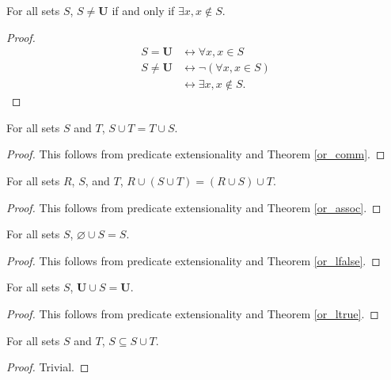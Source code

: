 \documentclass[../../math.tex]{subfiles}
\begin{document}
\begin{theorem} \label{all_neq}
    For all sets $S$, $S \neq \bm U$ if and only if $\exists x, x \notin S$.
\end{theorem}
\begin{proof}
    \begin{align*}
        S = \bm U &\leftrightarrow \forall x, x \in S \\
        S \neq \bm U &\leftrightarrow \neg(\forall x, x \in S) \\
                 &\leftrightarrow \exists x, x \notin S.
    \end{align*}
\end{proof}

\begin{theorem} \label{union_comm}
    For all sets $S$ and $T$, $S \cup T = T \cup S$.
\end{theorem}
\begin{proof}
    This follows from predicate extensionality and Theorem \ref{or_comm}.
\end{proof}

\begin{theorem} \label{union_assoc}
    For all sets $R$, $S$, and $T$, $R \cup (S \cup T) = (R \cup S) \cup T$.
\end{theorem}
\begin{proof}
    This follows from predicate extensionality and Theorem \ref{or_assoc}.
\end{proof}

\begin{theorem} \label{union_lid}
    For all sets $S$, $\varnothing \cup S = S$.
\end{theorem}
\begin{proof}
    This follows from predicate extensionality and Theorem \ref{or_lfalse}.
\end{proof}

\begin{theorem} \label{union_lanni}
    For all sets $S$, $\bm U \cup S = \bm U$.
\end{theorem}
\begin{proof}
    This follows from predicate extensionality and Theorem \ref{or_ltrue}.
\end{proof}

\begin{theorem} \label{union_lsub}
    For all sets $S$ and $T$, $S \subseteq S \cup T$.
\end{theorem}
\begin{proof}
    Trivial.
\end{proof}
\end{document}
